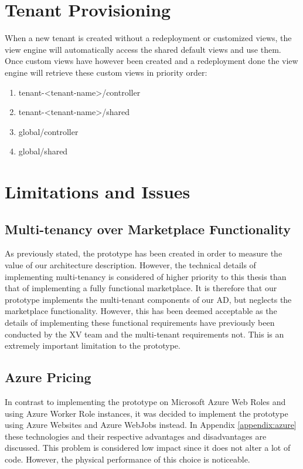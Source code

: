 \section{Tenant Provisioning}
When a new tenant is created without a redeployment or customized views, the view engine will automatically access the shared default views and use them. Once custom views have however been created and a redeployment done the view engine will retrieve these custom views in priority order:
\begin{enumerate}
\item tenant-<tenant-name>/controller
\item tenant-<tenant-name>/shared
\item global/controller
\item global/shared
\end{enumerate}

\section{Limitations and Issues}

\subsection{Multi-tenancy over Marketplace Functionality}
As previously stated, the prototype has been created in order to measure the value of our architecture description. However, the technical details of implementing multi-tenancy is considered of higher priority to this thesis than that of implementing a fully functional marketplace. It is therefore that our prototype implements the multi-tenant components of our AD, but neglects the marketplace functionality. However, this has been deemed acceptable as the details of implementing these functional requirements have previously been conducted by the XV team and the multi-tenant requirements not. This is an extremely important limitation to the prototype. 

\subsection{Azure Pricing}
In contrast to implementing the prototype on Microsoft Azure Web Roles and using Azure Worker Role instances, it was decided to implement the prototype using Azure Websites and Azure WebJobs instead. In Appendix \ref{appendix:azure} these technologies and their respective advantages and disadvantages are discussed. This problem is considered low impact since it does not alter a lot of code. However, the physical performance of this choice is noticeable.

